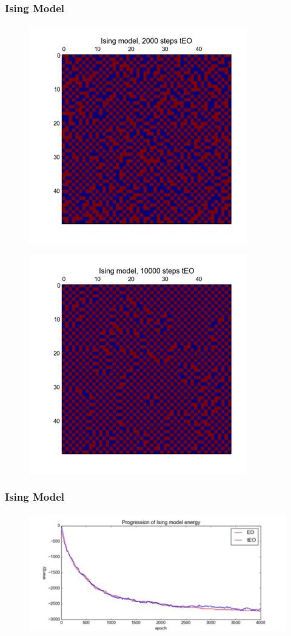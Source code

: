 \documentclass[12pt]{article}
\begin{document}
  \frametitle{Ising Model}
  \begin{figure}
    \includegraphics{2000}
  \end{figure}
  \begin{figure}
    \includegraphics{10000}
  \end{figure}
  
  \frametitle{Ising Model}
  \begin{figure}
    \includegraphics{ising_energy_unzoomed}
  \end{figure}
  
\end{document}
